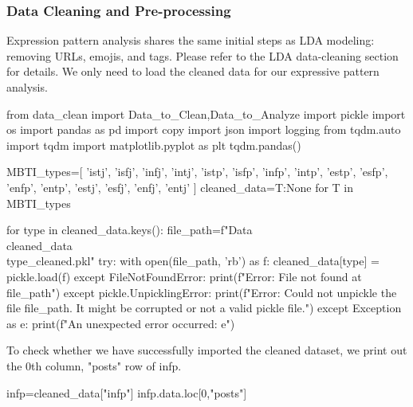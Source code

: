 \documentclass[12pt]{article}
\begin{document}
	\subsubsection{Data Cleaning and Pre-processing}
	Expression pattern analysis shares the same initial steps as LDA modeling: removing URLs, emojis, and tags. Please refer to the LDA data-cleaning section for details. We only need to load the cleaned data for our expressive pattern analysis.
	\begin{python}
from data_clean import Data_to_Clean,Data_to_Analyze
import pickle
import os
import pandas as pd
import copy
import json
import logging
from tqdm.auto import tqdm
import matplotlib.pyplot as plt
tqdm.pandas()

MBTI_types=[
    'istj', 'isfj', 'infj', 'intj', 
    'istp', 'isfp', 'infp', 'intp', 
    'estp', 'esfp', 'enfp', 'entp', 
    'estj', 'esfj', 'enfj', 'entj'
    ]
cleaned_data={T:None for T in MBTI_types}

for type in cleaned_data.keys():
    file_path=f"Data\\cleaned_data\\{type}_cleaned.pkl" 
    try:
        with open(file_path, 'rb') as f:
            cleaned_data[type] = pickle.load(f)
    except FileNotFoundError:
        print(f"Error: File not found at {file_path}")
    except pickle.UnpicklingError:
        print(f"Error: Could not unpickle the file {file_path}. It might be corrupted or not a valid pickle file.")
    except Exception as e:
        print(f"An unexpected error occurred: {e}")
	\end{python}
	
	To check whether we have successfully imported the cleaned dataset, we print out the 0th column,  "posts" row of infp.
	\begin{python}
infp=cleaned_data["infp"]
infp.data.loc[0,"posts"]
	\end{python}
	
\end{document}

